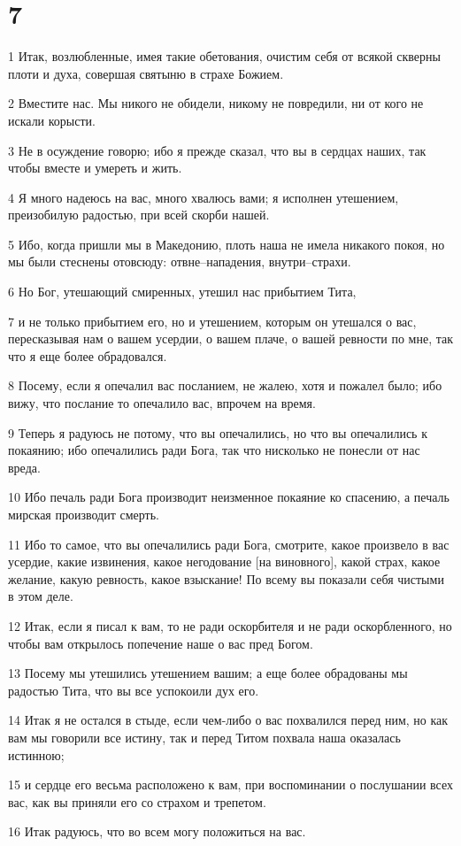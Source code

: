 \chapter{7}

\par 1 Итак, возлюбленные, имея такие обетования, очистим себя от всякой скверны плоти и духа, совершая святыню в страхе Божием.
\par 2 Вместите нас. Мы никого не обидели, никому не повредили, ни от кого не искали корысти.
\par 3 Не в осуждение говорю; ибо я прежде сказал, что вы в сердцах наших, так чтобы вместе и умереть и жить.
\par 4 Я много надеюсь на вас, много хвалюсь вами; я исполнен утешением, преизобилую радостью, при всей скорби нашей.
\par 5 Ибо, когда пришли мы в Македонию, плоть наша не имела никакого покоя, но мы были стеснены отовсюду: отвне--нападения, внутри--страхи.
\par 6 Но Бог, утешающий смиренных, утешил нас прибытием Тита,
\par 7 и не только прибытием его, но и утешением, которым он утешался о вас, пересказывая нам о вашем усердии, о вашем плаче, о вашей ревности по мне, так что я еще более обрадовался.
\par 8 Посему, если я опечалил вас посланием, не жалею, хотя и пожалел было; ибо вижу, что послание то опечалило вас, впрочем на время.
\par 9 Теперь я радуюсь не потому, что вы опечалились, но что вы опечалились к покаянию; ибо опечалились ради Бога, так что нисколько не понесли от нас вреда.
\par 10 Ибо печаль ради Бога производит неизменное покаяние ко спасению, а печаль мирская производит смерть.
\par 11 Ибо то самое, что вы опечалились ради Бога, смотрите, какое произвело в вас усердие, какие извинения, какое негодование [на виновного], какой страх, какое желание, какую ревность, какое взыскание! По всему вы показали себя чистыми в этом деле.
\par 12 Итак, если я писал к вам, то не ради оскорбителя и не ради оскорбленного, но чтобы вам открылось попечение наше о вас пред Богом.
\par 13 Посему мы утешились утешением вашим; а еще более обрадованы мы радостью Тита, что вы все успокоили дух его.
\par 14 Итак я не остался в стыде, если чем-либо о вас похвалился перед ним, но как вам мы говорили все истину, так и перед Титом похвала наша оказалась истинною;
\par 15 и сердце его весьма расположено к вам, при воспоминании о послушании всех вас, как вы приняли его со страхом и трепетом.
\par 16 Итак радуюсь, что во всем могу положиться на вас.

